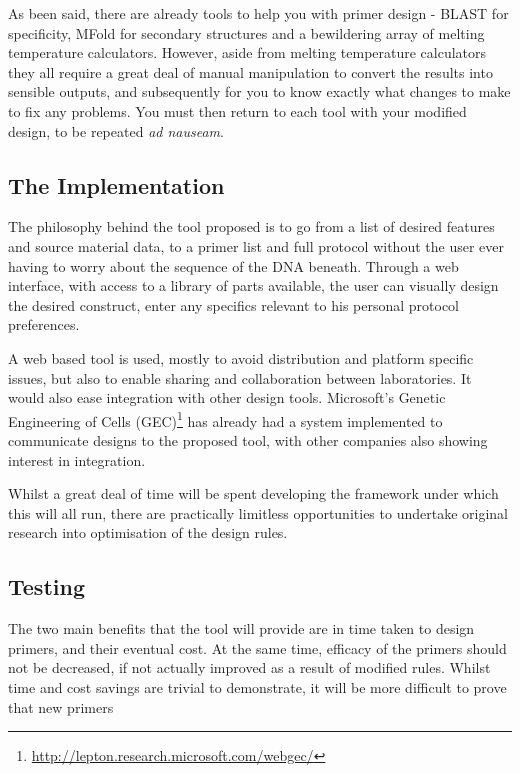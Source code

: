 \documentclass[../main.tex]{subfiles}
\begin{document}
As been said, there are already tools to help you with primer design - BLAST for specificity, MFold for secondary structures and a bewildering array of melting temperature calculators. However, aside from melting temperature calculators they all require a great deal of manual manipulation to convert the results into sensible outputs, and subsequently for you to know exactly what changes to make to fix any problems. You must then return to each tool with your modified design, to be repeated \emph{ad nauseam}.

\subsection{The Implementation}

The philosophy behind the tool proposed is to go from a list of desired features and source material data, to a primer list and full protocol without the user ever having to worry about the sequence of the DNA beneath. Through a web interface, with access to a library of parts available, the user can visually design the desired construct, enter any specifics relevant to his personal protocol preferences.

A web based tool is used, mostly to avoid distribution and platform specific issues, but also to enable sharing and collaboration between laboratories. It would also ease integration with other design tools. Microsoft's Genetic Engineering of Cells (GEC)\footnote{\url{http://lepton.research.microsoft.com/webgec/}} has already had a system implemented to communicate designs to the proposed tool, with other companies also showing interest in integration.

Whilst a great deal of time will be spent developing the framework under which this will all run, there are practically limitless opportunities to undertake original research into optimisation of the design rules.

\subsection{Testing}

The two main benefits that the tool will provide are in time taken to design primers, and their eventual cost. At the same time, efficacy of the primers should not be decreased, if not actually improved as a result of modified rules. Whilst time and cost savings are trivial to demonstrate, it will be more difficult to prove that new primers 
\end{document}
